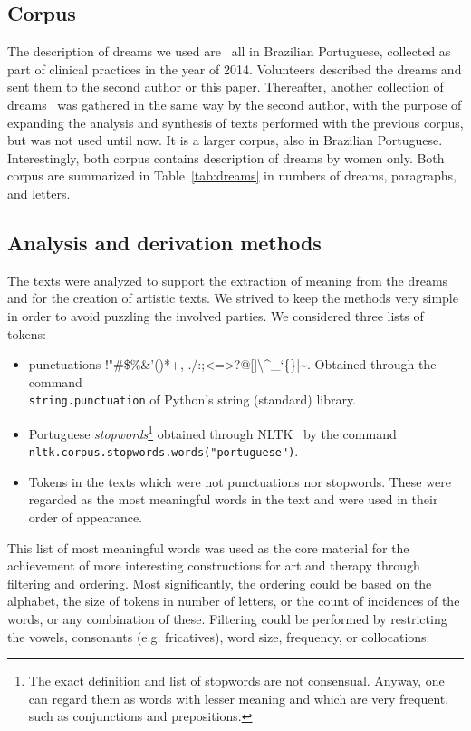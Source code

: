 \documentclass[12pt,fleqn]{article}
\begin{document}
\subsection{Corpus}
The description of dreams we used are~\cite{dreams1} all in Brazilian Portuguese,
collected as part of clinical practices in the year of 2014.
Volunteers described the dreams and sent them to the second author or this paper.
Thereafter, another collection of dreams~\cite{dreams2} was gathered in the same way by the second author,
with the purpose of expanding the analysis and synthesis of texts performed with the previous
corpus, but was not used until now.
It is a larger corpus, also in Brazilian Portuguese.
Interestingly, both corpus contains description of dreams by women only.
Both corpus are summarized in Table~\ref{tab:dreams} in numbers of dreams, paragraphs,
and letters.

\subsection{Analysis and derivation methods}
The texts were analyzed to support the extraction of meaning from the dreams
and for the creation of artistic texts.
We strived to keep the methods very simple in order to avoid puzzling the involved parties.
We considered three lists of tokens:
\begin{itemize}
	\item punctuations !"\#\$\%\&'()*+,-./:;<=>?@[]\textbackslash\textasciicircum\_`\{\}|\textasciitilde. Obtained through the command \\ \texttt{string.punctuation} of Python's string (standard) library.
	\item Portuguese \emph{stopwords}\footnote{The exact definition and list of stopwords are not consensual.
		Anyway, one can regard them as words with lesser meaning and which are very frequent, such as conjunctions and prepositions.}
		obtained through NLTK~\cite{nltk} by the command \\ \texttt{nltk.corpus.stopwords.words("portuguese")}.
	\item Tokens in the texts which were not punctuations nor stopwords.
		These were regarded as the most meaningful words in the text and were used in their order of appearance.
\end{itemize}

This list of most meaningful words was used as the core material for the achievement
of more interesting constructions for
art and therapy through filtering and ordering.
Most significantly, the ordering could be based on the alphabet, the size of tokens in number of letters,
or the count of incidences of the words, or any combination of these.
Filtering could be performed by restricting the vowels, consonants (e.g. fricatives), word size, frequency, or
collocations.
\end{document}
